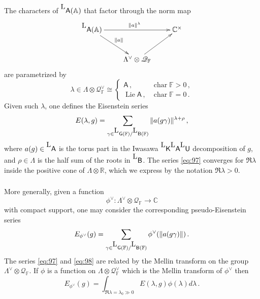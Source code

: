\documentclass[14pt]{extarticle}
\newcommand{\C}{\mathbb{C}}
\newcommand{\Ct}{\mathbb{C}^\times}
\newcommand{\A}{\mathbb{A}}
\newcommand{\F}{\mathbb{F}}
\newcommand{\R}{\mathbb{R}}
\newcommand{\bA}{\mathsf{A}}
\newcommand{\bG}{\mathsf{G}}
\newcommand{\bU}{\mathsf{U}}
\newcommand{\bB}{\mathsf{B}}
\newcommand{\cQ}{\mathscr{Q}}
\newcommand{\La}{{}^{\raisebox{2pt}{\textup{\tiny\textsf{L}}}}}
\DeclareMathOperator{\Lie}{Lie}
\DeclareMathOperator{\chr}{char}
\theoremstyle{definition}
\begin{document}
\subsubsection{}\label{s_Eis_def}

The characters of $\La\bA(\A)$ that factor through the norm map
%
\begin{equation}
  \label{eq:96}
  \xymatrix{
    \La\bA(\A) \ar[rr]^{\|a\|^\lambda} \ar[dr]^{\|a\|}&& \Ct \\
    & \Lambda^\vee \otimes \cQ_\F
    \ar[ru] 
    }
\end{equation}
%
are parametrized by
\[
  \lambda \in \Lambda \otimes \cQ_\F^\vee \cong
\begin{cases}
  \bA \,, &\chr \F >0 \,,\\
  \Lie \bA\,, & \chr \F = 0 \,. 
\end{cases}
\]
Given such $\lambda$, one defines the Eisenstein series
%
\begin{equation}
E(\lambda,g) = \sum_{\gamma \in \La\bG(\F)/\La\bB(\F)}
\| a(g \gamma)\|^{\lambda+\rho} \,,\label{eq:97}
\end{equation}
%
where $a(g)\in \La\bA$ is the torus part in the Iwasawa
$\La\mathsf{K} \La\bA \La\bU$ decomposition of $g$, and $\rho\in \Lambda$ is the half sum
of the roots in $\La\bB$. The series \eqref{eq:97}
converges for $\Re \lambda$ inside the positive cone of
$\Lambda \otimes \R$, which we express by the
notation $\Re \lambda > 0$. 

\subsubsection{}
More generally, given a
function
\[
  \phi^\vee: \Lambda^\vee \otimes \cQ_\F \to \C
\]
with compact support, one may consider the corresponding
pseudo-Eisenstein series
%
\begin{equation}
E_{\phi^\vee}(g) = \sum_{\gamma \in \La\bG(\F)/\La\bB(\F)}
\phi^\vee(\| a(g \gamma)\|) \,.\label{eq:98}
\end{equation}
%
The series \eqref{eq:97} and \eqref{eq:98} are related by the Mellin
transform on the group $\Lambda^\vee \otimes \cQ_\F$.
If $\phi$ is a function on $\Lambda \otimes \cQ_\F^\vee$ which is
the Mellin transform of $\phi^\vee$ then
\[
  E_{\phi^\vee}(g) = \int_{\Re \lambda = \lambda_0 \gg 0}
E(\lambda,g) \phi(\lambda) d \lambda  \,.
\]

\subsubsection{}
\end{document}
